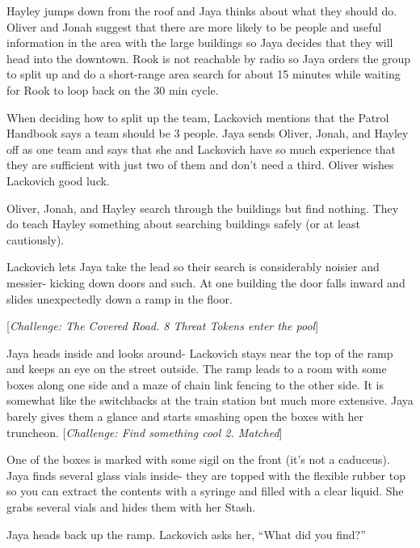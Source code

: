 Hayley jumps down from the roof and Jaya thinks about what they should do.  Oliver and Jonah suggest that there are more likely to be people and useful information in the area with the large buildings so Jaya decides that they will head into the downtown.  Rook is not reachable by radio so Jaya orders the group to split up and do a short-range area search for about 15 minutes while waiting for Rook to loop back on the 30 min cycle.



When deciding how to split up the team, Lackovich mentions that the Patrol Handbook says a team should be 3 people.  Jaya sends Oliver, Jonah, and Hayley off as one team and says that she and Lackovich have so much experience that they are sufficient with just two of them and don't need a third.  Oliver wishes Lackovich good luck.



Oliver, Jonah, and Hayley search through the buildings but find nothing.  They do teach Hayley something about searching buildings safely (or at least cautiously).



Lackovich lets Jaya take the lead so their search is considerably noisier and messier- kicking down doors and such.  At one building the door falls inward and slides unexpectedly down a ramp in the floor.  



{[}\textit{Challenge: The Covered Road.  8 Threat Tokens enter the pool}{]}



Jaya heads inside and looks around- Lackovich stays near the top of the ramp and keeps an eye on the street outside.  The ramp leads to a room with some boxes along one side and a maze of chain link fencing to the other side.  It is somewhat like the switchbacks at the train station but much more extensive.  Jaya barely gives them a glance and starts smashing open the boxes with her truncheon.  {[}\textit{Challenge: Find something cool 2. Matched}{]}



One of the boxes is marked with some sigil on the front (it's not a caduceus).  Jaya finds several glass vials inside- they are topped with the flexible rubber top so you can extract the contents with a syringe and filled with a clear liquid.  She grabs several vials and hides them with her Stash.



Jaya heads back up the ramp.  Lackovich asks her, ``What did you find?''

